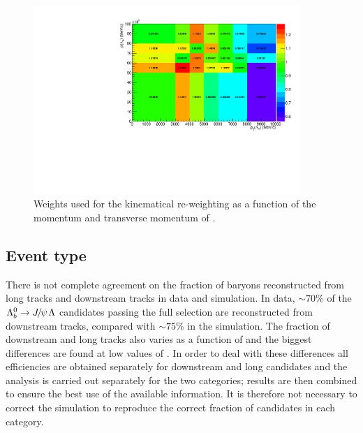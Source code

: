 \begin{figure}
\centering
\includegraphics[width=0.9\textwidth]{Lmumu/figs/ratio_Lb_p_pt.pdf}
 \caption{Weights used for the kinematical re-weighting as a function of the momentum and transverse momentum of \Lb. }
\label{fig:kinWeight}
\end{figure}

\subsection{Event type}

There is not complete agreement on the fraction of \Lz baryons reconstructed from long tracks and downstream tracks in data and simulation.
In data, $\sim 70\%$ of the \mbox{$\Lb\to\jpsi\Lz$} candidates passing the full selection are reconstructed from downstream tracks, 
compared with $\sim 75\%$ in the simulation.
The fraction of downstream and long tracks also varies as a function of \qsq and the biggest differences are found at low values of \qsq.
In order to deal with these differences all efficiencies are obtained separately for downstream and long candidates and the analysis is
carried out separately for the two categories; results are then combined to ensure the best use of the available information. 
It is therefore not necessary to correct the simulation to reproduce the correct fraction of candidates in each category.

